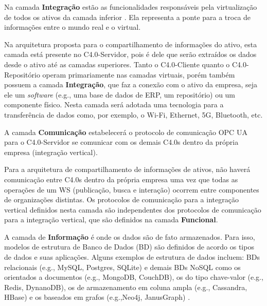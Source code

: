 	Na camada \textbf{Integração} estão as funcionalidades responsáveis pela virtualização de todos os ativos da camada inferior \cite{adolphs2015rami}. Ela representa a ponte para a troca de informações entre o mundo real e o virtual.
	
	Na arquitetura proposta para o compartilhamento de informações do ativo, esta camada está presente no C4.0-Servidor, pois é dele que serão extraídos os dados desde o ativo até as camadas superiores. Tanto o C4.0-Cliente quanto o C4.0-Repositório operam primariamente nas camadas virtuais, porém também possuem a camada \textbf{Integração}, que faz a conexão com o ativo da empresa, seja ele um \textit{software} (e.g., uma base de dados de ERP, um repositório) ou um componente físico. Nesta camada será adotada uma tecnologia para a transferência de dados como, por exemplo, o Wi-Fi, Ethernet, 5G, Bluetooth, etc.
	
	A camada \textbf{Comunicação} estabelecerá o protocolo de comunicação OPC UA para o C4.0-Servidor se comunicar com os demais C4.0s dentro da própria empresa (integração vertical).
	
	Para a arquitetura de compartilhamento de informações de ativos, não haverá comunicação entre C4.0s dentro da própria empresa uma vez que todas as operações de um WS (publicação, busca e interação) ocorrem entre componentes de organizações distintas. Os protocolos de comunicação para a integração vertical definidos nesta camada são independentes dos protocolos de comunicação para a integração vertical, que são definidos na camada \textbf{Funcional}. %
	


	A camada de \textbf{Informação} é onde os dados são de fato armazenados. Para isso, modelos de estrutura de Banco de Dados (BD) são definidos de acordo os tipos de dados e suas aplicações. Alguns exemplos de estrutura de dados incluem: BDs relacionais (e.g., MySQL, Postgres, SQLite) \cite{morris2017relationaldatabase} e demais BDs NoSQL como os orientados a documentos (e.g., MongoDB, CouchDB), os do tipo chave-valor (e.g., Redis, DynanoDB), os de armazenamento em coluna ampla (e.g., Cassandra, HBase) e os baseados em grafos (e.g.,Neo4j, JanusGraph) \cite{schaefer2019nosql}.
	
